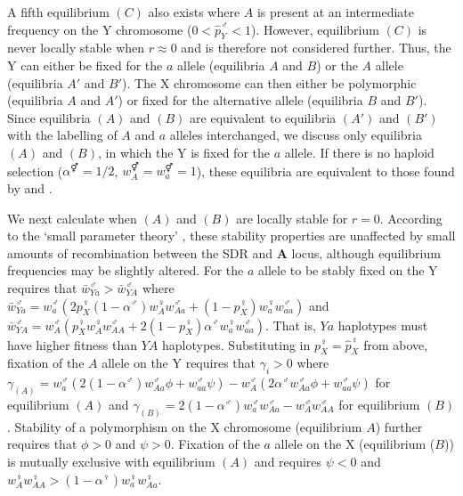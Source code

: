 \documentclass[12pt]{article}
\begin{document}
\noindent
A fifth equilibrium $(C)$ also exists where $A$ is present at an intermediate frequency on the Y chromosome ($0<\hat{p}_{Y}^{\male}<1$). However, equilibrium $(C)$ is never locally stable when $r \approx 0$ and is therefore not considered further. 
Thus, the Y can either be fixed for the $a$ allele (equilibria $A$ and $B$) or the $A$ allele (equilibria $A'$ and $B'$).
The X chromosome can then either be polymorphic (equilibria $A$ and $A'$) or fixed for the alternative allele (equilibria $B$ and $B'$).
Since equilibria $(A)$ and $(B)$ are equivalent to equilibria $(A')$ and $(B')$ with the labelling of $A$ and $a$ alleles interchanged, we discuss only equilibria $(A)$ and $(B)$, in which the Y is fixed for the $a$ allele. 
If there is no haploid selection ($\alpha^{\Hermaphrodite}=1/2$, $w_{A}^{\Hermaphrodite}=w_{a}^{\Hermaphrodite}=1$), these equilibria are equivalent to those found by \cite{Lloyd1977} and \cite{Otto2014}.

We next calculate when $(A)$ and $(B)$ are locally stable for $r=0$. According to the `small parameter theory' \citep{Karlin:1972ab,Karlin:1972dq}, these stability properties are unaffected by small amounts of recombination between the SDR and \textbf{A} locus, although equilibrium frequencies may be slightly altered. 
For the $a$ allele to be stably fixed on the Y requires that $\bar{w}_{Ya}^{\male}>\bar{w}_{YA}^{\male}$ where $\bar{w}_{Ya}^{\male}=w_{a}^{\male}(2 p_{X}^{\female}(1-\alpha^{\male}) w_{A}^{\female} w_{Aa}^{\male}+ (1-p_{X}^{\female})w_{a}^{\female} w_{aa}^{\male} )$ and $\bar{w}_{YA}^{\male}=w_{A}^{\male}(p_{X}^{\female} w_{A}^{\female} w_{AA}^{\male}+ 2 (1-p_{X}^{\female})\alpha^{\male}w_{a}^{\female} w_{aa}^{\male} )$. That is, $Ya$ haplotypes must have higher fitness than $YA$ haplotypes.  
Substituting in $p_{X}^{\female} = \hat{p}_{X}^{\female}$ from above, fixation of the $A$ allele on the Y requires that $\gamma_{i}>0$ where $\gamma_{(A)}=w_{a}^{\male}(2(1-\alpha^{\male})w_{Aa}^{\male} \phi + w_{aa}^{\male} \psi)-w_{A}^{\male}(2\alpha^{\male}w_{Aa}^{\male} \phi + w_{aa}^{\male} \psi)$ for equilibrium $(A)$ and $\gamma_{(B)}=2(1-\alpha^{\male})w_{a}^{\male}w_{Aa}^{\male}-w_{A}^{\male}w_{AA}^{\male}$ for equilibrium $(B)$.
Stability of a polymorphism on the X chromosome (equilibrium $A$) further requires that $\phi >0$ and $\psi >0$. 
Fixation of the $a$ allele on the X (equilibrium ($B$)) is mutually exclusive with equilibrium $(A)$ and requires $\psi<0$ and $w_{A}^{\female}w_{AA}^{\female}>(1-\alpha^{\female})w_{a}^{\female}w_{Aa}^{\female}$. 
\end{document}
